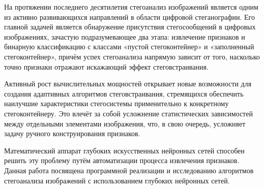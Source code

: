 

На протяжении последнего десятилетия стегоанализ изображений является одним из активно развивающихся направлений в области цифровой стеганографии. Его главной задачей является обнаружение присутствия стегосообщений в цифровых изображениях, зачастую подразумевающее два этапа: извлечение признаков и бинарную классификацию с классами «пустой стегоконтейнер» и «заполненный стегоконтейнер», причём успех стегоанализа напрямую зависит от того, насколько точно признаки отражают искажающий эффект стеговстраивания.

Активный рост вычислительных мощностей открывает новые возможности для создания адаптивных алгоритмов стеговстраивания, стремящихся обеспечить наилучшие характеристики стегосистемы применительно к конкретному стегоконтейнеру. Это влечёт за собой усложнение статистических зависимостей между отдельными элементами изображения, что, в свою очередь, усложняет задачу ручного конструирования признаков.

Математический аппарат глубоких искусственных нейронных сетей способен решить эту проблему путём автоматизации процесса извлечения признаков. Данная работа посвящена программной реализации и исследованию алгоритмов стегоанализа изображений с использованием глубоких нейронных сетей.

\clearpage
